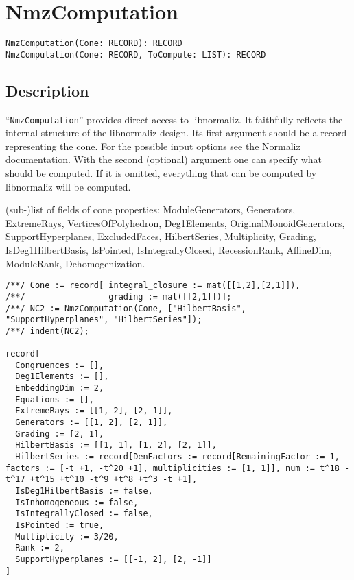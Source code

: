 \documentclass[a4paper]{mybook}
\newenvironment{command}{}{} %
\begin{document}
\section{NmzComputation}
\label{NmzComputation}
\begin{command} %


\begin{Verbatim}[label=syntax, rulecolor=\color{MidnightBlue},
frame=single]
NmzComputation(Cone: RECORD): RECORD
NmzComputation(Cone: RECORD, ToCompute: LIST): RECORD
\end{Verbatim}


\subsection*{Description}

``\verb&NmzComputation&'' provides direct access to libnormaliz.  It faithfully
reflects the internal structure of the libnormaliz design.  Its first
argument should be a record representing the cone.  For the possible
input options see the Normaliz documentation.  With the second (optional)
argument one can specify what should be computed.  If it is omitted,
everything that can be computed by libnormaliz will be computed.
\par 
(sub-)list of fields of cone properties:
ModuleGenerators, Generators, ExtremeRays, VerticesOfPolyhedron,
Deg1Elements, OriginalMonoidGenerators, SupportHyperplanes,
ExcludedFaces, HilbertSeries, Multiplicity, Grading,
IsDeg1HilbertBasis, IsPointed, IsIntegrallyClosed, RecessionRank,
AffineDim, ModuleRank, Dehomogenization. 
\begin{Verbatim}[label=example, rulecolor=\color{PineGreen}, frame=single]
/**/ Cone := record[ integral_closure := mat([[1,2],[2,1]]),
/**/                 grading := mat([[2,1]])];
/**/ NC2 := NmzComputation(Cone, ["HilbertBasis", "SupportHyperplanes", "HilbertSeries"]);
/**/ indent(NC2);

record[
  Congruences := [],
  Deg1Elements := [],
  EmbeddingDim := 2,
  Equations := [],
  ExtremeRays := [[1, 2], [2, 1]],
  Generators := [[1, 2], [2, 1]],
  Grading := [2, 1],
  HilbertBasis := [[1, 1], [1, 2], [2, 1]],
  HilbertSeries := record[DenFactors := record[RemainingFactor := 1, factors := [-t +1, -t^20 +1], multiplicities := [1, 1]], num := t^18 -t^17 +t^15 +t^10 -t^9 +t^8 +t^3 -t +1],
  IsDeg1HilbertBasis := false,
  IsInhomogeneous := false,
  IsIntegrallyClosed := false,
  IsPointed := true,
  Multiplicity := 3/20,
  Rank := 2,
  SupportHyperplanes := [[-1, 2], [2, -1]]
]
\end{Verbatim}



\end{command}
\end{document}
